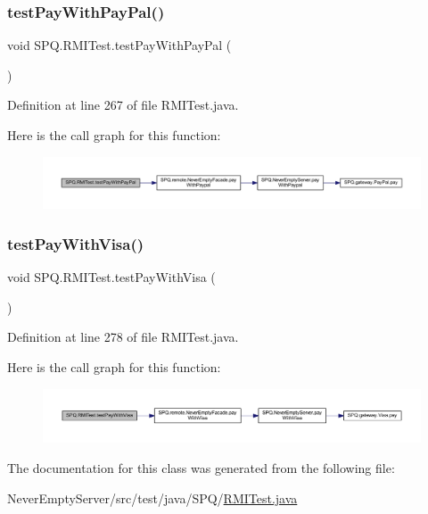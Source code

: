 \subsubsection{\texorpdfstring{test\+Pay\+With\+Pay\+Pal()}{testPayWithPayPal()}}
{\footnotesize\ttfamily void S\+P\+Q.\+R\+M\+I\+Test.\+test\+Pay\+With\+Pay\+Pal (\begin{DoxyParamCaption}{ }\end{DoxyParamCaption})}



Definition at line 267 of file R\+M\+I\+Test.\+java.

Here is the call graph for this function\+:
\nopagebreak
\begin{figure}[H]
\begin{center}
\leavevmode
\includegraphics[width=350pt]{class_s_p_q_1_1_r_m_i_test_a15a72e3572c99f10ba0ac5b0368f1a02_cgraph}
\end{center}
\end{figure}
\mbox{\label{class_s_p_q_1_1_r_m_i_test_afc93d812f0763a7bd63583e6a573f024}} 
\subsubsection{\texorpdfstring{test\+Pay\+With\+Visa()}{testPayWithVisa()}}
{\footnotesize\ttfamily void S\+P\+Q.\+R\+M\+I\+Test.\+test\+Pay\+With\+Visa (\begin{DoxyParamCaption}{ }\end{DoxyParamCaption})}



Definition at line 278 of file R\+M\+I\+Test.\+java.

Here is the call graph for this function\+:
\nopagebreak
\begin{figure}[H]
\begin{center}
\leavevmode
\includegraphics[width=350pt]{class_s_p_q_1_1_r_m_i_test_afc93d812f0763a7bd63583e6a573f024_cgraph}
\end{center}
\end{figure}


The documentation for this class was generated from the following file\+:\begin{DoxyCompactItemize}
\item 
Never\+Empty\+Server/src/test/java/\+S\+P\+Q/\mbox{\hyperlink{_r_m_i_test_8java}{R\+M\+I\+Test.\+java}}\end{DoxyCompactItemize}
